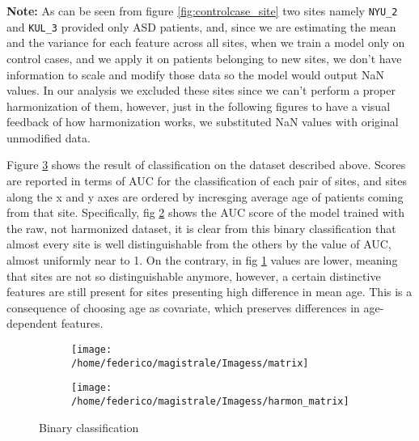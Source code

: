 \documentclass[a4paper,11pt]{article}
\begin{document}
\textbf{Note:} As can be seen from figure \ref{fig:controlcase_site} two sites namely \texttt{NYU\_2} and \texttt{KUL\_3} provided only ASD patients, and, since we are estimating the mean and the variance for each feature across all sites, when we train a model only on control cases, and we apply it on patients belonging to new sites, we don't have information to scale and modify those data so the model would output NaN values.
In our analysis we excluded these sites since we can't perform a proper harmonization of them, however, just in the following figures to have a visual feedback of how harmonization works, we substituted NaN values with original unmodified data.
\newline

Figure \ref{fig:heatmap_harmonization} shows the result of classification on the dataset described above. Scores are reported in terms of AUC for the classification of each pair of sites, and sites along the x and y axes are ordered by incresging average age of patients coming from that site.
Specifically, fig \ref{fig:heatmap_harmonization_noharmon} shows the AUC score of the model trained with the raw, not harmonized dataset, it is clear from this binary classification that almost every site is well distinguishable from the others by the value of AUC, almost uniformly near to 1.
On the contrary, in fig \ref{fig:heatmap_harmonization_harmon} values are lower, meaning that sites are not so distinguishable anymore, however, a certain distinctive features are still present for sites presenting high difference in mean age.
This is a consequence of choosing age as covariate, which preserves differences in age-dependent features.



\begin{figure}
\centering
\begin{subfigure}[b]{0.8\textwidth}
   \texttt{[image: /home/federico/magistrale/Imagess/matrix]}
   \caption{}
   \label{fig:heatmap_harmonization_harmon}
\end{subfigure}

\begin{subfigure}[b]{0.8\textwidth}
   \texttt{[image: /home/federico/magistrale/Imagess/harmon\_matrix]}
   \caption{}
   \label{fig:heatmap_harmonization_noharmon}
\end{subfigure}

\caption{Binary classification}
\label{fig:heatmap_harmonization}
\end{figure}
\end{document}
